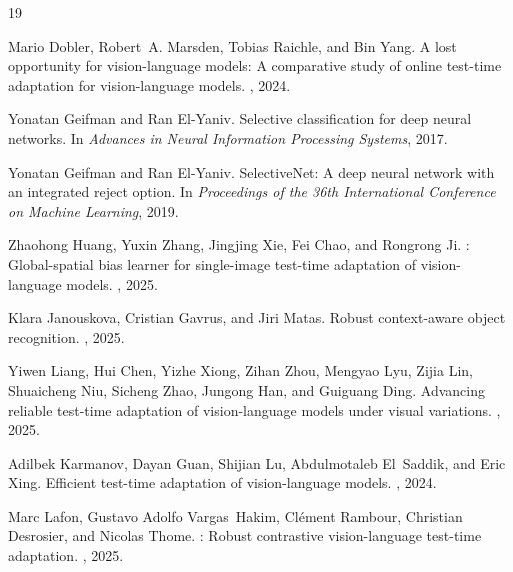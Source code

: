 \documentclass{article}
\begin{document}

\begin{thebibliography}{19}

Mario Dobler, Robert~A. Marsden, Tobias Raichle, and Bin Yang.
\newblock A lost opportunity for vision-language models: A comparative study of online test-time adaptation for vision-language models.
, 2024.

Yonatan Geifman and Ran El-Yaniv.
\newblock Selective classification for deep neural networks.
\newblock In {\em Advances in Neural Information Processing Systems}, 2017.

Yonatan Geifman and Ran El-Yaniv.
\newblock SelectiveNet: A deep neural network with an integrated reject option.
\newblock In {\em Proceedings of the 36th International Conference on Machine Learning}, 2019.

Zhaohong Huang, Yuxin Zhang, Jingjing Xie, Fei Chao, and Rongrong Ji.
: Global-spatial bias learner for single-image test-time adaptation of vision-language models.
, 2025.

Klara Janouskova, Cristian Gavrus, and Jiri Matas.
\newblock Robust context-aware object recognition.
, 2025.

Yiwen Liang, Hui Chen, Yizhe Xiong, Zihan Zhou, Mengyao Lyu, Zijia Lin, Shuaicheng Niu, Sicheng Zhao, Jungong Han, and Guiguang Ding.
\newblock Advancing reliable test-time adaptation of vision-language models under visual variations.
, 2025.

Adilbek Karmanov, Dayan Guan, Shijian Lu, Abdulmotaleb El~Saddik, and Eric Xing.
\newblock Efficient test-time adaptation of vision-language models.
, 2024.

Marc Lafon, Gustavo Adolfo Vargas~Hakim, Cl{\'e}ment Rambour, Christian Desrosier, and Nicolas Thome.
: Robust contrastive vision-language test-time adaptation.
, 2025.


\end{thebibliography}
\end{document}

